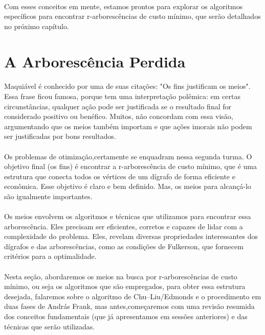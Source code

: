 \documentclass[12pt,a4paper]{article}
\begin{document}
\paragraph{}
Com esses conceitos em mente, estamos prontos para explorar os algoritmos específicos para encontrar r-arborescências de custo mínimo, que serão detalhados no próximo capítulo.

\section{A Arborescência Perdida}

\paragraph{}
Maquiável é conhecido por uma de suas citações: "Os fins justificam os meios". Essa frase ficou famosa, porque tem uma interpretação polêmica: em certas circunstâncias, qualquer ação pode ser justificada se o resultado final for considerado positivo ou benéfico. Muitos, não concordam com essa visão, argumentando que os meios também importam e que ações imorais não podem ser justificadas por bons resultados.

\paragraph{}
Os problemas de otimização,certamente se enquadram nessa segunda turma. O objetivo final (os fins) é encontrar a r-arborescência de custo mínimo, que é uma estrutura que conecta todos os vértices de um dígrafo de forma eficiente e econômica. Esse objetivo é claro e bem definido. Mas, os meios para alcançá-lo são igualmente importantes.

\paragraph{}
Os meios envolvem os algoritmos e técnicas que utilizamos para encontrar essa arborescência. Eles precisam ser eficientes, corretos e capazes de lidar com a complexidade do problema. Eles, revelam diversas propriedades interessantes dos dígrafos e das arborescências, como as condições de Fulkerson, que fornecem critérios para a optimalidade.

\paragraph{}
Nesta seção, abordaremos os meios na busca por r-arborescências de custo mínimo, ou seja os algoritmos que são empregados, para obter essa estrutura desejada, falaremos sobre o algoritmo de Chu–Liu/Edmonds e o procedimento em duas fases de András Frank, mas antes,começaremos com uma revisão resumida dos conceitos fundamentais (que já apresentamos em sessões anteriores) e das técnicas que serão utilizadas.
\end{document}
